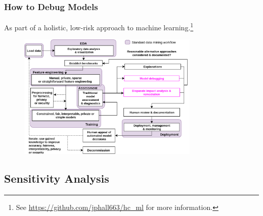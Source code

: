 \documentclass[11pt,
               aspectratio=169,
               hyperref={colorlinks}
               ]{beamer}
\begin{document}
			\begin{frame}
		
				\frametitle{How to Debug Models}
		
				\footnotesize{As part of a holistic, low-risk approach to machine learning}.\footnote{\tiny{See \url{https://github.com/jphall663/hc_ml} for more information.}}
				\begin{figure}
					\begin{center}
						\includegraphics[height=170pt]{../img/blueprint.png}
					\end{center}
				\end{figure}	
				\normalsize
		
			\end{frame}

		\subsection{Sensitivity Analysis}
\end{document}
